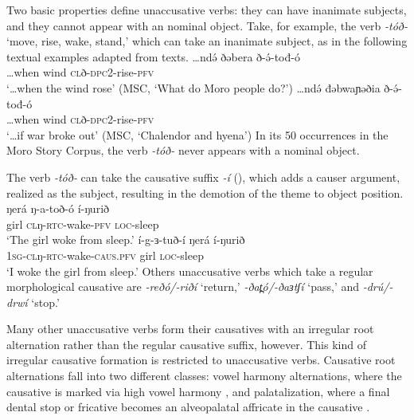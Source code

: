 Two basic properties define unaccusative verbs: they can have inanimate subjects, and they cannot appear with an nominal object. Take, for example, the verb \textit{-tóð-} `move, rise, wake, stand,' which can take an inanimate subject, as in the following textual examples adapted from texts. 
\ea 
\gll \ldots ndə́  ðəbera ð-ə́-tođ-ó\\
\ldots when wind \textsc{cl}ð-\textsc{dpc2}-rise-\textsc{pfv}\\
\glt `\ldots when the wind rose' \hfill (MSC, `What do Moro people do?')\label{ex:ch12:windrise}
\ex \gll \ldots ndə́  đǝbwaɲǝðia ð-ə́-tođ-ó\\
\ldots when wind \textsc{cl}ð-\textsc{dpc2}-rise-\textsc{pfv}\\
\glt `\ldots if war broke out' \hfill (MSC, `Chalendor and hyena')
\z 
In its 50 occurrences in the Moro Story Corpus, the verb \textit{-tóð-} never appears with a nominal object.


The verb \textit{-tóð-} can take the causative suffix \textit{-í} (), which adds a causer argument, realized as the subject, resulting in the demotion of the theme to object position.
\ea
\ea \gll  	ŋerá ŋ-a-toð-ó í-ŋurið	\\
			girl	\textsc{cl}ŋ-\textsc{rtc}-wake-\textsc{pfv} \textsc{loc}-sleep \\
	\glt	‘The girl woke from sleep.’ 
\ex \gll  	í-g-ɜ-tuð-í ŋerá í-ŋurið		\\
				\textsc{1sg-cl}ŋ-\textsc{rtc}-wake-\textsc{caus.pfv} girl \textsc{loc}-sleep \\
	\glt	‘I woke the girl from sleep.’ \label{ex:ch12:overtcauseb}
\z 
\z 
Others unaccusative verbs which take a regular morphological causative are \textit{-reðó/-riðí} `return,' \textit{-ðat̪ó/-ðaɜtʃí} `pass,' and \textit{-drú/-drwí} `stop.' %

Many other unaccusative verbs form their causatives with an irregular root alternation rather than the regular causative suffix, however. This kind of irregular causative formation is restricted to unaccusative verbs. Causative root alternations fall into two different classes: vowel harmony alternations, where the causative is marked via high vowel harmony , and palatalization, where a final dental stop or fricative becomes an alveopalatal affricate in the causative  .

